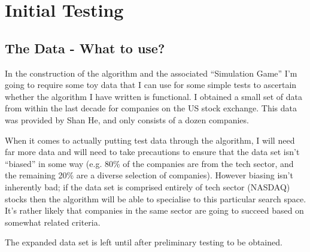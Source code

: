 \section{Initial Testing}
\subsection{The Data - What to use?}
In the construction of the algorithm and the associated ``Simulation Game'' I'm going to require some toy data that I can use for some simple tests to ascertain whether the algorithm I have written is functional. I obtained a small set of data from within the last decade for companies on the US stock exchange. This data was provided by Shan He, and only consists of a dozen companies. \newline

When it comes to actually putting test data through the algorithm, I will need far more data and will need to take precautions to ensure that the data set isn't ``biased'' in some way (e.g. 80\% of the companies are from the tech sector, and the remaining 20\% are a diverse selection of companies). However biasing isn't inherently bad; if the data set is comprised entirely of tech sector (NASDAQ) stocks then the algorithm will be able to specialise to this particular search space. It's rather likely that companies in the same sector are going to succeed based on somewhat related criteria. \newline

The expanded data set is left until after preliminary testing to be obtained.

